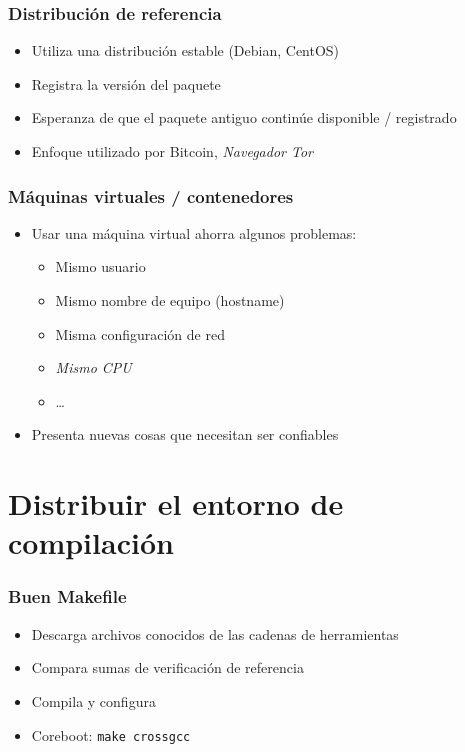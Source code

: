 \documentclass[14pt,aspectratio=169]{beamer}
\begin{document}
\begin{frame}
 \frametitle{Distribución de referencia}

 \begin{itemize}
  \item Utiliza una distribución estable (Debian, CentOS)
  \item Registra la versión del paquete
  \item Esperanza de que el paquete antiguo continúe disponible / registrado
  \item Enfoque utilizado por Bitcoin, \textit{Navegador Tor}
 \end{itemize}
\end{frame}

\begin{frame}
 \frametitle{Máquinas virtuales / contenedores}

 \begin{itemize}
  \item Usar una máquina virtual ahorra algunos problemas:
   \begin{itemize}
    \item Mismo usuario
    \item Mismo nombre de equipo (hostname)
    \item Misma configuración de red
    \item \textit{Mismo CPU}
    \item …
   \end{itemize}
  \item Presenta nuevas cosas que necesitan ser confiables
 \end{itemize}
\end{frame}

\section{Distribuir el entorno de compilación}

\begin{frame}
 \frametitle{Buen Makefile}

 \begin{itemize}
  \item Descarga archivos conocidos de las cadenas de herramientas
  \item Compara sumas de verificación de referencia
  \item Compila y configura
  \item Coreboot: \texttt{make crossgcc}
 \end{itemize}
\end{frame}
\end{document}
